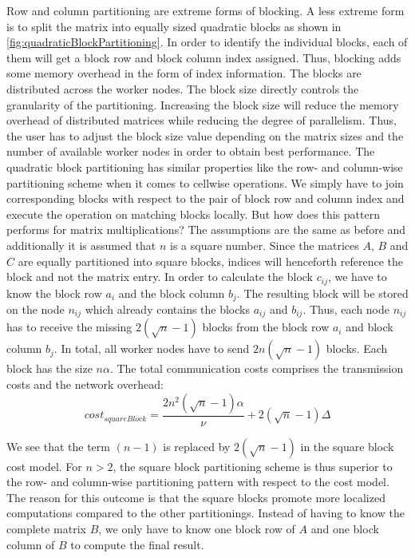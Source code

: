 Row and column partitioning are extreme forms of blocking. 
A less extreme form is to split the matrix into equally sized quadratic blocks as shown in \cref{fig:quadraticBlockPartitioning}. 
In order to identify the individual blocks, each of them will get a block row and block column index assigned. 
Thus, blocking adds some memory overhead in the form of index information. 
The blocks are distributed across the worker nodes. 
The block size directly controls the granularity of the partitioning. 
Increasing the block size will reduce the memory overhead of distributed matrices while reducing the degree of parallelism. 
Thus, the user has to adjust the block size value depending on the matrix sizes and the number of available worker nodes in order to obtain best performance. 
The quadratic block partitioning has similar properties like the row- and column-wise partitioning scheme when it comes to cellwise operations. 
We simply have to join corresponding blocks with respect to the pair of block row and column index and execute the operation on matching blocks locally. 
But how does this pattern performs for matrix multiplications? 
The assumptions are the same as before and additionally it is assumed that $n$ is a square number. 
Since the matrices $A$, $B$ and $C$ are equally partitioned into square blocks, indices will henceforth reference the block and not the matrix entry. In order to calculate the block $c_{ij}$, we have to know the block row $a_{i}$ and the block column $b_{j}$. 
The resulting block will be stored on the node $n_{ij}$ which already contains the blocks $a_{ij}$ and $b_{ij}$. 
Thus, each node $n_{ij}$ has to receive the missing $2\left(\sqrt{n}-1\right)$ blocks from the block row $a_{i}$ and block column $b_{j}$. 
In total, all worker nodes have to send $2n\left(\sqrt{n}-1\right)$ blocks. 
Each block has the size $n\alpha$. 
The total communication costs comprises the transmission costs and the network overhead:
\small
\begin{displaymath}
	cost_{squareBlock} = \frac{2n^2\left(\sqrt{n}-1\right)\alpha}{\nu} + 2\left(\sqrt{n}-1\right)\Delta
\end{displaymath}
\normalsize

We see that the term $(n-1)$ is replaced by $2\left(\sqrt{n}-1\right)$ in the square block cost model. 
For $n>2$, the square block partitioning scheme is thus superior to the row- and column-wise partitioning pattern with respect to the cost model. 
The reason for this outcome is that the square blocks promote more localized computations compared to the other partitionings. 
Instead of having to know the complete matrix $B$, we only have to know one block row of $A$ and one block column of $B$ to compute the final result. 

